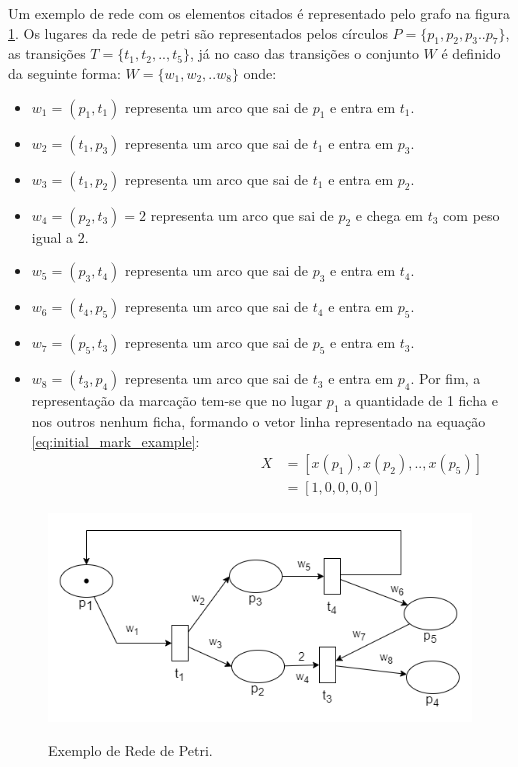 Um exemplo de rede com os elementos citados é representado pelo grafo na figura \ref{fig:ex_rp}. Os lugares da rede de petri são  representados pelos círculos $P = \{p_1,p_2,p_3 .. p_7\}$, as transições $T=\{t_1, t_2 ,.., t_5\}$, já no caso das transições o conjunto $W$ é definido da seguinte forma:
$W = \{w_1,w_2, .. w_8 \}$
onde:
\begin{itemize}
     \item $w_1 = (p_1, t_1)$ representa um arco que sai de $p_1$ e entra em $t_1$.
    \item $w_2 = (t_1, p_3)$ representa um arco que sai de $t_1$ e entra em $p_3$.
    \item $w_3 = (t_1, p_2)$ representa um arco que sai de $t_1$ e entra em $p_2$.
    \item $w_4 = (p_2, t_3) = 2$ representa um arco que sai de $p_2$ e chega em $t_3$ com peso igual a $2$.
    \item $w_5 = (p_3, t_4)$ representa um arco que sai de $p_3$ e entra em $t_4$.
    \item $w_6 = (t_4, p_5)$ representa um arco que sai de $t_4$ e entra em $p_5$.
    \item $w_7 = (p_5, t_3)$ representa um arco que sai de $p_5$ e entra em $t_3$.
    \item $w_8 = (t_3, p_4)$ representa um arco que sai de $t_3$ e entra em $p_4$.
Por fim, a representação da marcação tem-se que no lugar $p_1$ a quantidade de 1 ficha e nos outros nenhum ficha, formando o vetor linha representado na equação \ref{eq:initial_mark_example}:
\begin{equation}
\label{eq:initial_mark_example}
\hspace{6cm} %
    \begin{split}
    X &= [x(p_1), x(p_2), .., x(p_5)] \\
    &= [1,0,0,0,0]           
    \end{split}
\end{equation}

\end{itemize}
\begin{figure}[ht]
\centering
\caption{Exemplo de Rede de Petri.}
\includegraphics[scale=0.8] {figures/Petri/exemplo_rp.png}
\label{fig:ex_rp}
\end{figure}

